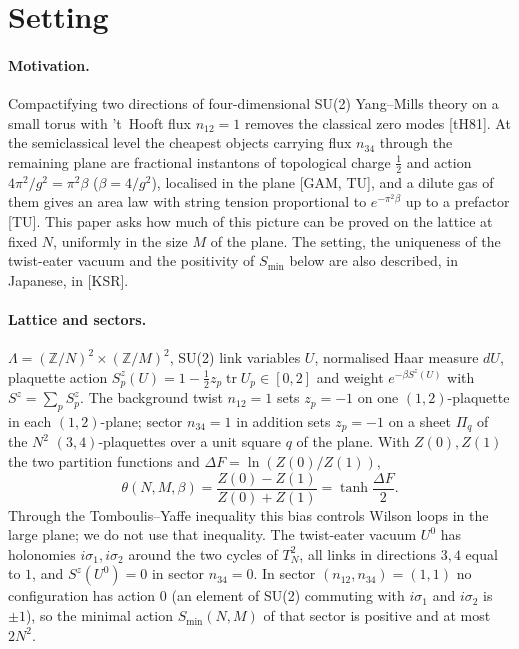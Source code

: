 \documentclass[11pt,a4paper]{article}
\theoremstyle{definition}
\theoremstyle{remark}
\newcommand{\tr}{\operatorname{tr}}
\begin{document}
\section{Setting}\label{sec:setting}

\paragraph{Motivation.}
Compactifying two directions of four-dimensional SU(2) Yang--Mills theory on a small torus with 't~Hooft flux $n_{12}=1$ removes the classical zero modes [tH81].
At the semiclassical level the cheapest objects carrying flux $n_{34}$ through the remaining plane are fractional instantons of topological charge $\frac12$ and action $4\pi^2/g^2=\pi^2\beta$ ($\beta=4/g^2$), localised in the plane [GAM, TU], and a dilute gas of them gives an area law with string tension proportional to $e^{-\pi^2\beta}$ up to a prefactor [TU].
This paper asks how much of this picture can be proved on the lattice at fixed $N$, uniformly in the size $M$ of the plane.
The setting, the uniqueness of the twist-eater vacuum and the positivity of $S_{\min}$ below are also described, in Japanese, in [KSR].

\paragraph{Lattice and sectors.}
$\Lambda=(\mathbb{Z}/N)^2\times(\mathbb{Z}/M)^2$, SU(2) link variables $U$, normalised Haar measure $dU$, plaquette action $S^z_p(U)=1-\frac12 z_p\tr U_p\in[0,2]$ and weight $e^{-\beta S^z(U)}$ with $S^z=\sum_pS^z_p$.
The background twist $n_{12}=1$ sets $z_p=-1$ on one $(1,2)$-plaquette in each $(1,2)$-plane; sector $n_{34}=1$ in addition sets $z_p=-1$ on a sheet $\Pi_q$ of the $N^2$ $(3,4)$-plaquettes over a unit square $q$ of the plane.
With $Z(0),Z(1)$ the two partition functions and $\Delta F=\ln(Z(0)/Z(1))$,
\[ \theta(N,M,\beta)=\frac{Z(0)-Z(1)}{Z(0)+Z(1)}=\tanh\frac{\Delta F}{2}. \]
Through the Tomboulis--Yaffe inequality this bias controls Wilson loops in the large plane; we do not use that inequality.
The twist-eater vacuum $U^0$ has holonomies $i\sigma_1,i\sigma_2$ around the two cycles of $T^2_N$, all links in directions $3,4$ equal to $1$, and $S^z(U^0)=0$ in sector $n_{34}=0$.
In sector $(n_{12},n_{34})=(1,1)$ no configuration has action $0$ (an element of SU(2) commuting with $i\sigma_1$ and $i\sigma_2$ is $\pm1$), so the minimal action $S_{\min}(N,M)$ of that sector is positive and at most $2N^2$.
\end{document}
